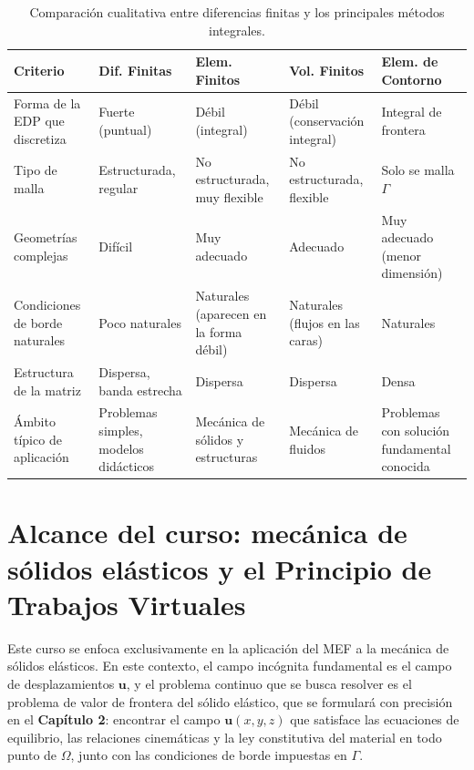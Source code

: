 \begin{table}[htbp]
\centering
\caption{Comparación cualitativa entre diferencias finitas y los principales métodos integrales.}
\label{tab:cap01-comparacion-metodos}
\begin{tabular}{@{}p{2.6cm}p{2.6cm}p{2.6cm}p{2.6cm}p{2.6cm}@{}}
\toprule
\textbf{Criterio} & \textbf{Dif. Finitas} & \textbf{Elem. Finitos} & \textbf{Vol. Finitos} & \textbf{Elem. de Contorno} \\
\midrule
Forma de la EDP que discretiza & Fuerte (puntual) & Débil (integral) & Débil (conservación integral) & Integral de frontera \\
Tipo de malla & Estructurada, regular & No estructurada, muy flexible & No estructurada, flexible & Solo se malla $\Gamma$ \\
Geometrías complejas & Difícil & Muy adecuado & Adecuado & Muy adecuado (menor dimensión) \\
Condiciones de borde naturales & Poco naturales & Naturales (aparecen en la forma débil) & Naturales (flujos en las caras) & Naturales \\
Estructura de la matriz & Dispersa, banda estrecha & Dispersa & Dispersa & Densa \\
Ámbito típico de aplicación & Problemas simples, modelos didácticos & Mecánica de sólidos y estructuras & Mecánica de fluidos & Problemas con solución fundamental conocida \\
\bottomrule
\end{tabular}
\end{table}

\section{Alcance del curso: mecánica de sólidos elásticos y el Principio de Trabajos Virtuales}
\label{sec:cap01-alcance-curso}

Este curso se enfoca exclusivamente en la aplicación del MEF a la mecánica de sólidos elásticos. En este contexto, el campo incógnita fundamental es el campo de desplazamientos $\bm{u}$, y el problema continuo que se busca resolver es el problema de valor de frontera del sólido elástico, que se formulará con precisión en el \textbf{Capítulo 2}: encontrar el campo $\bm{u}(x,y,z)$ que satisface las ecuaciones de equilibrio, las relaciones cinemáticas y la ley constitutiva del material en todo punto de $\Omega$, junto con las condiciones de borde impuestas en $\Gamma$.

